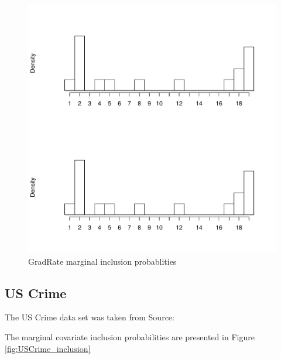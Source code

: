 \documentclass{amsart}[12pt]
\begin{document}
\begin{figure}[p]
\label{fig:GradRate_inclusion}
\caption{GradRate marginal inclusion probablities}
\includegraphics[scale=.4]{GradRate_histogram.pdf}
\end{figure}

\subsection{US Crime}
The US Crime data set was taken from Source: \cite{James:2014:ISL:2517747}

The marginal covariate inclusion probabilities are presented in Figure \ref{fig:USCrime_inclusion}

\end{document}
